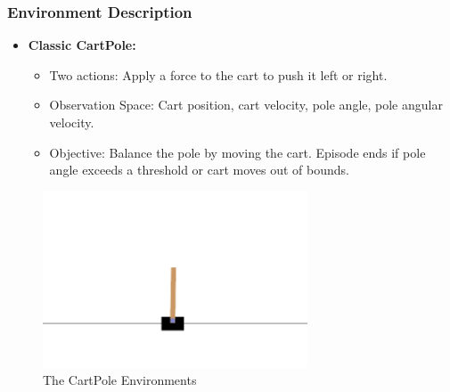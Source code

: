 \documentclass{beamer}
\begin{document}
\begin{frame}
\frametitle{Environment Description}
\begin{itemize}
    \item \textbf{Classic CartPole:}
    \begin{itemize}
        \item Two actions: Apply a force to the cart to push it left or right.
        \item Observation Space: Cart position, cart velocity, pole angle, pole angular velocity.
        \item Objective: Balance the pole by moving the cart. Episode ends if pole angle exceeds a threshold or cart moves out of bounds.
    \end{itemize}
\end{itemize}

\begin{figure}[ht]
    \centering
    \includegraphics[width=0.7\textwidth]{images/cart_pole.png}
    \caption{The CartPole Environments}
    \label{fig:env_comparison}
\end{figure}
\end{frame}
\end{document}
